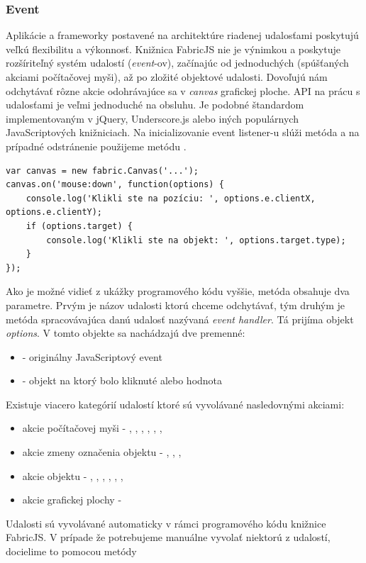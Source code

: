 \subsubsection{Event}

Aplikácie a frameworky postavené na architektúre riadenej udalosťami poskytujú veľkú flexibilitu a výkonnosť. Knižnica FabricJS nie je výnimkou a poskytuje rozšíriteľný systém udalostí (\textit{event}-ov), začínajúc od jednoduchých (spúšťaných akciami počítačovej myši), až po zložité objektové udalosti. Dovoľujú nám odchytávať rôzne akcie odohrávajúce sa v \textit{canvas} grafickej ploche. API na prácu s udalosťami je veľmi jednoduché na obsluhu. Je podobné štandardom implementovaným v jQuery, Underscore.js alebo iných populárnych JavaScriptových knižniciach. Na inicializovanie event listener-u slúži metóda  a na prípadné odstránenie použijeme metódu .
\begin{lstlisting}[style=web,caption={Ukážka programovej implementácie na prácu s eventami},captionpos=b, label={lst:fabric-events}]
var canvas = new fabric.Canvas('...');
canvas.on('mouse:down', function(options) {
	console.log('Klikli ste na pozíciu: ', options.e.clientX, options.e.clientY);
	if (options.target) {
		console.log('Klikli ste na objekt: ', options.target.type);
	}
});
\end{lstlisting}
Ako je možné vidieť z ukážky programového kódu vyššie, metóda  obsahuje dva parametre. Prvým je názov udalosti ktorú chceme odchytávať, tým druhým je metóda spracovávajúca danú udalosť nazývaná \textit{event handler}. Tá prijíma objekt \textit{options}. V tomto objekte sa nachádzajú dve premenné:
\begin{itemize}
	\item {} - originálny JavaScriptový event
	\item {} - objekt na ktorý bolo kliknuté alebo hodnota 
\end{itemize}
Existuje viacero kategórií udalostí ktoré sú vyvolávané nasledovnými akciami:
\begin{itemize}
	\item akcie počítačovej myši - , , , , , , 
	\item akcie zmeny označenia objektu - , , , 
	\item akcie objektu - , , , , , , 
	\item akcie grafickej plochy - 
\end{itemize}
Udalosti sú vyvolávané automaticky v rámci programového kódu knižnice FabricJS. V prípade že potrebujeme manuálne vyvolať niektorú z udalostí, docielime to pomocou metódy  

